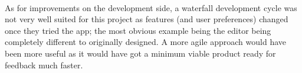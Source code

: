 \documentclass{report}
\begin{document}
\paragraph{}
As for improvements on the development side, a waterfall development cycle was not very well suited for this project as features (and user preferences) changed once they tried the app; the most obvious example being the editor being completely different to originally designed. A more agile approach would have been more useful as it would have got a minimum viable product ready for feedback much faster.

\printbibliography
\end{document}
